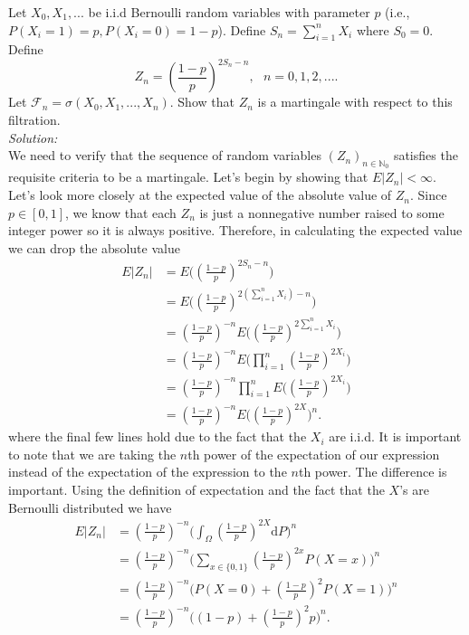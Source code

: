 \documentclass[10pt]{amsart}
\newcommand{\D}{\mathrm{d}}
\begin{document}
 Let $X_0, X_1, . . .$  be i.i.d Bernoulli random variables with parameter $p$ (i.e., $P(X_i = 1) = p, P(X_i = 0) =1- p$). Define $S_n = \sum_{i=1}^n X_i$ where $S_0 = 0$. Define
$$Z_n = \left(\frac{1-p}{p} \right)^{2S_n-n}, \,\,\,\, n = 0, 1, 2, . . . .$$
Let $\mathcal{F}_n = \sigma(X_0, X_1, . . . , X_n )$. Show that $Z_n$ is a martingale with respect to this filtration. \\
\textit{Solution:} \\
We need to verify that the sequence of random variables $(Z_n)_{n \in \mathbb N_0}$ satisfies the requisite criteria to be a martingale.
Let's begin by showing that $E|Z_n| < \infty$.
Let's look more closely at the expected value of the absolute value of $Z_n$.
Since $p \in [0, 1]$, we know that each $Z_n$ is just a nonnegative number raised to some integer power so it is always positive.
Therefore, in calculating the expected value we can drop the absolute value
\begin{align*}
E|Z_n| &= E\Bigg(\left(\frac{1-p}{p} \right)^{2S_n-n}\Bigg) \\
	&= E\bigg(\left(\frac{1-p}{p} \right)^{2(\sum_{i=1}^n X_i)-n}\bigg) \\
	&= \left(\frac{1-p}{p} \right)^{-n} E\Bigg(\left(\frac{1-p}{p} \right)^{2\sum_{i=1}^n X_i}\Bigg) \\
	&= \left(\frac{1-p}{p} \right)^{-n} E\Bigg( \prod_{i = 1}^n \left(\frac{1-p}{p} \right)^{2 X_i}\Bigg) \\
	&= \left(\frac{1-p}{p} \right)^{-n}\prod_{i = 1}^n E\Bigg( \left(\frac{1-p}{p} \right)^{2 X_i}\Bigg) \\
	&= \left(\frac{1-p}{p} \right)^{-n} E\Bigg( \left(\frac{1-p}{p} \right)^{2 X}\Bigg)^n.
\end{align*}
where the final few lines hold due to the fact that the $X_i$ are i.i.d.
It is important to note that we are taking the $n$th power of the expectation of our expression instead of the expectation of the expression  to the $n$th power. The difference is important.
Using the definition of expectation and the fact that the $X$'s are Bernoulli distributed we have
\begin{align*}
E|Z_n| &= \left(\frac{1-p}{p} \right)^{-n} \Bigg(\int_\Omega \left(\frac{1-p}{p} \right)^{2 X} \D P \Bigg)^n \\
	&= \left(\frac{1-p}{p} \right)^{-n} \Bigg(\sum_{x \in \{0, 1\}} \left(\frac{1-p}{p} \right)^{2 x} P(X = x) \Bigg)^n \\
	&= \left(\frac{1-p}{p} \right)^{-n} \Bigg(P(X = 0) + \left(\frac{1-p}{p} \right)^2 P(X = 1)\Bigg)^n \\
	&= \left(\frac{1-p}{p} \right)^{-n} \Bigg((1-p) + \left(\frac{1-p}{p} \right)^2 p\Bigg)^n.
\end{align*}
\end{document}
